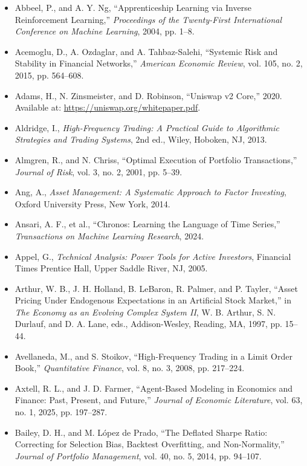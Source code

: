 \documentclass{book}
\begin{document}
\begin{itemize}
    \item Abbeel, P., and A. Y. Ng, ``Apprenticeship Learning via Inverse Reinforcement Learning,'' \emph{Proceedings of the Twenty-First International Conference on Machine Learning}, 2004, pp. 1--8.
    \item Acemoglu, D., A. Ozdaglar, and A. Tahbaz-Salehi, ``Systemic Risk and Stability in Financial Networks,'' \emph{American Economic Review}, vol. 105, no. 2, 2015, pp. 564--608.
    \item Adams, H., N. Zinsmeister, and D. Robinson, ``Uniswap v2 Core,'' 2020. Available at: \url{https://uniswap.org/whitepaper.pdf}.
    \item Aldridge, I., \emph{High-Frequency Trading: A Practical Guide to Algorithmic Strategies and Trading Systems}, 2nd ed., Wiley, Hoboken, NJ, 2013.
    \item Almgren, R., and N. Chriss, ``Optimal Execution of Portfolio Transactions,'' \emph{Journal of Risk}, vol. 3, no. 2, 2001, pp. 5--39.
    \item Ang, A., \emph{Asset Management: A Systematic Approach to Factor Investing}, Oxford University Press, New York, 2014.
    \item Ansari, A. F., et al., ``Chronos: Learning the Language of Time Series,'' \emph{Transactions on Machine Learning Research}, 2024.
    \item Appel, G., \emph{Technical Analysis: Power Tools for Active Investors}, Financial Times Prentice Hall, Upper Saddle River, NJ, 2005.
    \item Arthur, W. B., J. H. Holland, B. LeBaron, R. Palmer, and P. Tayler, ``Asset Pricing Under Endogenous Expectations in an Artificial Stock Market,'' in \emph{The Economy as an Evolving Complex System II}, W. B. Arthur, S. N. Durlauf, and D. A. Lane, eds., Addison-Wesley, Reading, MA, 1997, pp. 15--44.
    \item Avellaneda, M., and S. Stoikov, ``High-Frequency Trading in a Limit Order Book,'' \emph{Quantitative Finance}, vol. 8, no. 3, 2008, pp. 217--224.
    \item Axtell, R. L., and J. D. Farmer, ``Agent-Based Modeling in Economics and Finance: Past, Present, and Future,'' \emph{Journal of Economic Literature}, vol. 63, no. 1, 2025, pp. 197--287.
    \item Bailey, D. H., and M. L\'opez de Prado, ``The Deflated Sharpe Ratio: Correcting for Selection Bias, Backtest Overfitting, and Non-Normality,'' \emph{Journal of Portfolio Management}, vol. 40, no. 5, 2014, pp. 94--107.

\end{itemize}
\end{document}
